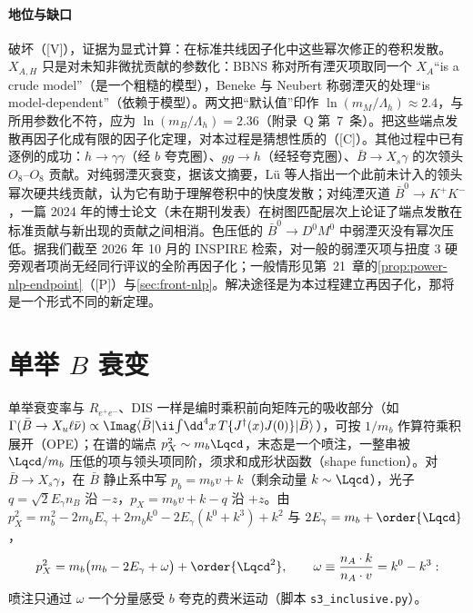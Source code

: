 \paragraph{地位与缺口}
破坏（[V]），证据为显式计算：在标准共线因子化中这些幂次修正的卷积发散。$X_{A,H}$ 只是对未知非微扰贡献的参数化：BBNS 称对所有湮灭项取同一个 $X_A$“is a crude model”（是一个粗糙的模型）\cite[第~3.5~节]{BenekeEtAl2001}，Beneke 与 Neubert 称弱湮灭的处理“is model-dependent”（依赖于模型）\cite[第~2.4~节]{BenekeNeubert2003}。两文把“默认值”印作 $\ln(m_M/\Lambda_h)\approx2.4$，与所用参数化不符，应为 $\ln(m_B/\Lambda_h)=2.36$（附录~Q 第~7~条）。把这些端点发散再因子化成有限的因子化定理，对本过程是猜想性质的（[C]）。其他过程中已有逐例的成功：$h\to\gamma\gamma$（经 $b$ 夸克圈）\cite{Liu:2019oav,Liu:2020wbn}、$gg\to h$（经轻夸克圈）\cite{Liu:2022ajh}、$\bar B\to X_s\gamma$ 的次领头 $O_8$--$O_8$ 贡献\cite{Hurth:2023paz}。对纯弱湮灭衰变，据该文摘要，Lü 等人指出一个此前未计入的领头幂次硬共线贡献，认为它有助于理解卷积中的快度发散\cite{Lu:2022kos}；对纯湮灭道 $\bar B^0\to K^+K^-$，一篇 2024 年的博士论文（未在期刊发表）在树图匹配层次上论证了端点发散在标准贡献与新出现的贡献之间相消\cite{Stillger:2024sgy}。色压低的 $\bar B^0\to D^0M^0$ 中弱湮灭没有幂次压低\cite{Mantry:2003uz}。据我们截至 2026 年 10 月的 INSPIRE 检索，对一般的弱湮灭项与扭度 3 硬旁观者项尚无经同行评议的全阶再因子化；一般情形见第~21~章的\cref{prop:power-nlp-endpoint}（[P]）与\cref{sec:front-nlp}。解决途径是为本过程建立再因子化，那将是一个形式不同的新定理。

\section{单举 $B$ 衰变}\label{sec:heavy-inclusive}

单举衰变率与 $R_{e^+e^-}$、DIS 一样是编时乘积前向矩阵元的吸收部分（如 $\Gamma(\bar B\to X_u\ell\bar\nu)\propto\Imag\langle\bar B|\ii\!\int\!\dd^4x\,T\{J^\dagger(x)J(0)\}|\bar B\rangle$），可按 $1/m_b$ 作算符乘积展开（OPE）；在谱的端点 $p_X^2\sim m_b\Lqcd$，末态是一个喷注，一整串被 $\Lqcd/m_b$ 压低的项与领头项同阶，须求和成形状函数（shape function）。对 $\bar B\to X_s\gamma$，在 $\bar B$ 静止系中写 $p_b=m_bv+k$（剩余动量 $k\sim\Lqcd$），光子 $q=\sqrt2E_\gamma n_B$ 沿 $-z$，$p_X=m_bv+k-q$ 沿 $+z$。由 $p_X^2=m_b^2-2m_bE_\gamma+2m_bk^0-2E_\gamma(k^0+k^3)+k^2$ 与 $2E_\gamma=m_b+\order{\Lqcd}$，
\begin{equation}\label{eq:heavy-pX2}
p_X^2=m_b\big(m_b-2E_\gamma+\omega\big)+\order{\Lqcd^2},\qquad \omega\equiv\frac{n_A\cdot k}{n_A\cdot v}=k^0-k^3 :
\end{equation}
喷注只通过 $\omega$ 一个分量感受 $b$ 夸克的费米运动（脚本 \texttt{s3\_\allowbreak inclusive.py}）。

